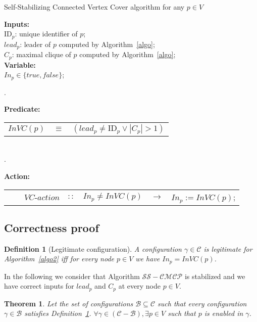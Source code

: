 \documentclass[11pt,letterpaper,onecolumn]{article}
\newtheorem{definition}{Definition}
\newtheorem{theorem}{Theorem}
\newcommand{\id}{\mbox{ID}}
\begin{document}
\begin{algorithm}
\caption{\quad Self-Stabilizing Connected Vertex Cover algorithm for any $p \in V$\label{algo2}}
\smallskip
\begin{scriptsize}
{\bf Inputs:}\\
\hspace*{1cm}$\id_p$: unique identifier of $p$;\\
\hspace*{1cm}$lead_p$: leader of $p$ computed by Algorithm~\ref{algo};\\
\hspace*{1cm}$C_p$: maximal clique of $p$ computed by Algorithm~\ref{algo};\\
{\bf Variable:}\\
\hspace*{1cm}$In_p \in \{true, false\}$;

.\dotfill\ 

{\bf Predicate:}\\
\begin{tabular}{lll}
$InVC(p)$ & $\equiv$ & $(lead_p \neq \id_p \vee |C_p|>1)$\\
\end{tabular}\\
.\dotfill\

{\bf Action:}\\
\begin{tabular}{lllllll}
&& $VC$-$action$  & $::$ & $In_p \neq InVC(p)$ & $\to$ & $In_p:=InVC(p)$;\\
\end{tabular}
\end{scriptsize}
\end{algorithm}


\subsection{Correctness proof}

\begin{definition}[Legitimate configuration]
\label{def:config_legitime_cvc}
A configuration $\gamma \in \mathcal{C}$ is legitimate for Algorithm~\ref{algo2} iff for every node $p \in V$ we have $In_p=InVC(p)$.
\end{definition}

In the following we consider that Algorithm $\mathcal{SS-CMCP}$ is stabilized and we have correct inputs for $lead_p$ and $C_p$ at every node $p \in V$.

\begin{theorem}
\label{thm:cvc_enable_action}
Let the set of configurations $\mathcal{B} \subseteq \mathcal{C}$ such that every configuration $\gamma \in \mathcal{B}$ satisfies Definition~\ref{def:config_legitime_cvc}. $\forall \gamma \in (\mathcal{C}-\mathcal{B}), \exists p \in V$ such that $p$ is enabled in $\gamma$.
\end{theorem}
\end{document}
